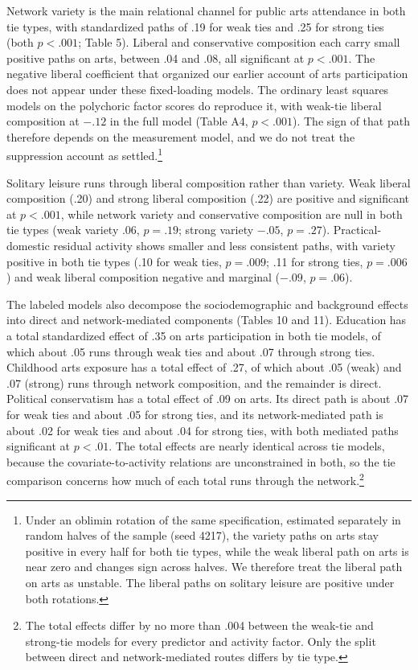 \documentclass[
  12pt
]{article}
\begin{document}
Network variety is the main relational channel for public arts attendance in both tie types, with standardized paths of .19 for weak ties and .25 for strong ties (both $p < .001$; Table 5). Liberal and conservative composition each carry small positive paths on arts, between .04 and .08, all significant at $p < .001$. The negative liberal coefficient that organized our earlier account of arts participation does not appear under these fixed-loading models. The ordinary least squares models on the polychoric factor scores do reproduce it, with weak-tie liberal composition at $-.12$ in the full model (Table A4, $p < .001$). The sign of that path therefore depends on the measurement model, and we do not treat the suppression account as settled.\footnote{Under an oblimin rotation of the same specification, estimated separately in random halves of the sample (seed 4217), the variety paths on arts stay positive in every half for both tie types, while the weak liberal path on arts is near zero and changes sign across halves. We therefore treat the liberal path on arts as unstable. The liberal paths on solitary leisure are positive under both rotations.}

Solitary leisure runs through liberal composition rather than variety. Weak liberal composition (.20) and strong liberal composition (.22) are positive and significant at $p < .001$, while network variety and conservative composition are null in both tie types (weak variety .06, $p = .19$; strong variety $-.05$, $p = .27$). Practical-domestic residual activity shows smaller and less consistent paths, with variety positive in both tie types (.10 for weak ties, $p = .009$; .11 for strong ties, $p = .006$) and weak liberal composition negative and marginal ($-.09$, $p = .06$).

The labeled models also decompose the sociodemographic and background effects into direct and network-mediated components (Tables 10 and 11). Education has a total standardized effect of .35 on arts participation in both tie models, of which about .05 runs through weak ties and about .07 through strong ties. Childhood arts exposure has a total effect of .27, of which about .05 (weak) and .07 (strong) runs through network composition, and the remainder is direct. Political conservatism has a total effect of .09 on arts. Its direct path is about .07 for weak ties and about .05 for strong ties, and its network-mediated path is about .02 for weak ties and about .04 for strong ties, with both mediated paths significant at $p < .01$. The total effects are nearly identical across tie models, because the covariate-to-activity relations are unconstrained in both, so the tie comparison concerns how much of each total runs through the network.\footnote{The total effects differ by no more than .004 between the weak-tie and strong-tie models for every predictor and activity factor. Only the split between direct and network-mediated routes differs by tie type.}
\end{document}

